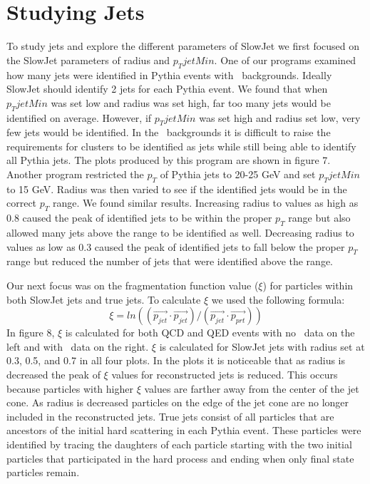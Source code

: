 \documentclass[11pt]{article}
\begin{document}
\section{Studying Jets}
%
%
To study jets and explore the different parameters of SlowJet we first focused on the SlowJet parameters of radius and $p_TjetMin$. One of our programs examined how many jets were identified in Pythia events with \trento\ backgrounds. Ideally SlowJet should identify 2 jets for each Pythia event. We found that when $p_TjetMin$ was set low and radius was set high, far too many jets would be identified on average. However, if $p_TjetMin$ was set high and radius set low, very few jets would be identified. In the \trento\ backgrounds it is difficult to raise the requirements for clusters to be identified as jets while still being able to identify all Pythia jets. The plots produced by this program are shown in figure 7. Another program restricted the $p_T$ of Pythia jets to 20-25 GeV and set $p_TjetMin$ to 15 GeV. Radius was then varied to see if the identified jets would be in the correct $p_T$ range. We found similar results. Increasing radius to values as high as 0.8 caused the peak of identified jets to be within the proper $p_T$ range but also allowed many jets above the range to be identified as well. Decreasing radius to values as low as 0.3 caused the peak of identified jets to fall below the proper $p_T$ range but reduced the number of jets that were identified above the range.

Our next focus was on the fragmentation function value ($\xi$) for particles within both SlowJet jets and true jets. To calculate $\xi$ we used the following formula:
\[\xi = ln((\vec{p_{jet}} \cdot \vec{p_{jet}})/(\vec{p_{jet}} \cdot \vec{p_{prt}}))\]
In figure 8, $\xi$ is calculated for both QCD and QED events with no \trento\ data on the left and with \trento\ data on the right. $\xi$ is calculated for SlowJet jets with radius set at 0.3, 0.5, and 0.7 in all four plots. In the plots it is noticeable that as radius is decreased the peak of $\xi$ values for reconstructed jets is reduced. This occurs because particles with higher $\xi$ values are farther away from the center of the jet cone. As radius is decreased particles on the edge of the jet cone are no longer included in the reconstructed jets. True jets consist of all particles that are ancestors of the initial hard scattering in each Pythia event. These particles were identified by tracing the daughters of each particle starting with the two initial particles that participated in the hard process and ending when only final state particles remain.
\end{document}
